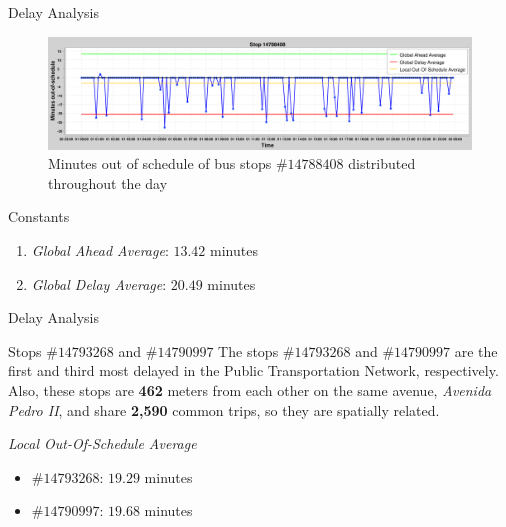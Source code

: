 \documentclass[xcolor=dvipsnames,table]{beamer}
\begin{document}
\begin{frame}{Delay Analysis}
        \begin{figure}[H]
                \centering
                \caption{Minutes out of schedule of bus stops $\#14788408$ distributed throughout the day}
                \includegraphics[width=\textwidth]{images/stops1.png}
        \end{figure}
        \begin{block}{Constants} 
                \begin{enumerate}
                        \item \textit{Global Ahead Average}: $13.42$ minutes 
                        \item \textit{Global Delay Average}: $20.49$ minutes 
                \end{enumerate}
        \end{block}
\end{frame}
\begin{frame}{Delay Analysis}
        \begin{block}{Stops $\#14793268$ and $\#14790997$} 
                The stops $\#14793268$ and $\#14790997$ are the first and third most delayed in the Public Transportation Network, respectively.
                Also, these stops are \textbf{462} meters from each other on the same avenue, \textit{Avenida Pedro II}, and share \textbf{2,590} common trips, so they are spatially related.
        \end{block}
        \begin{block}{\textit{Local Out-Of-Schedule Average}} 
                \begin{itemize}
                        \item $\#14793268$: $19.29$ minutes 
                        \item $\#14790997$: $19.68$ minutes 
                \end{itemize}
        \end{block}
\end{frame}
\end{document}
